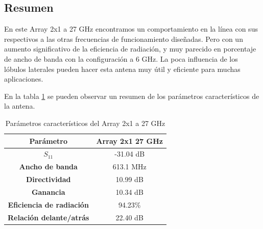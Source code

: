 \subsection{Resumen}
\par En este Array 2x1 a 27 GHz encontramos un comportamiento  en la línea con sus respectivos a las otras frecuencias de funcionamiento diseñadas. Pero con un aumento significativo de la eficiencia de radiación, y muy parecido en porcentaje de ancho de banda con la configuración a 6 GHz. La poca influencia de los lóbulos laterales pueden hacer esta antena muy útil y eficiente para muchas aplicaciones.
\\
\par En la tabla \ref{tab:res2x13} se pueden observar un resumen de los parámetros característicos de la antena.
\begin{table}[H]
  
  
   \small %
   \centering %
   \begin{tabular}{c c} %
   \toprule[\heavyrulewidth]\toprule[\heavyrulewidth]
   \textbf{Parámetro} & \textbf{Array 2x1 27 GHz} \\ 
   \midrule
   \textbf{$S_{11}$} & -31.04 dB \\
   \textbf{Ancho de banda} & 613.1 MHz \\
   \textbf{Directividad} & 10.99 dB \\
   \textbf{Ganancia} & 10.34 dB \\
   \textbf{Eficiencia de radiación} & 94.23\% \\
   \textbf{Relación delante/atrás} & 22.40 dB \\

   \bottomrule[\heavyrulewidth] 
   \end{tabular}
   \caption{Parámetros característicos del Array 2x1 a 27 GHz} 
    \label{tab:res2x13}
\end{table}





























